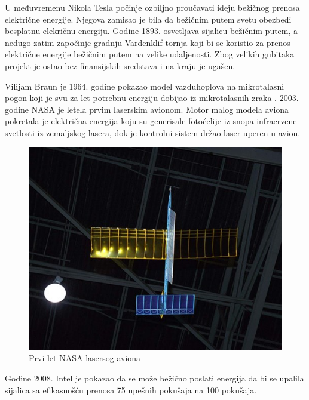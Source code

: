 \documentclass[a4paper]{article}
\begin{document}
U međuvremenu Nikola Tesla počinje ozbiljno proučavati ideju bežičnog prenosa električne energije. Njegova zamisao je bila da bežičnim putem svetu obezbedi besplatnu elekričnu energiju. Godine 1893. osvetljava sijalicu bežičnim putem, a nedugo zatim započinje gradnju Vardenklif tornja
koji bi se koristio za prenos električne energije bežičnim putem na velike udaljenosti. Zbog velikih gubitaka projekt je ostao bez finansijskih sredstava i na kraju je ugašen. 

Vilijam Braun je 1964. godine pokazao model vazduhoplova na mikrotalasni pogon koji je svu
za let potrebnu energiju dobijao iz mikrotalasnih zraka \cite{brown1996history}.
2003. godine NASA je letela prvim laserskim avionom. Motor malog modela aviona pokretala je električna energija koju su generisale fotoćelije iz snopa infracrvene svetlosti iz zemaljskog lasera, dok je kontrolni sistem držao laser uperen u avion.

\begin{figure}[h!]
    \centering
    \includegraphics[scale=0.4]{aircraft.jpg}
    \caption{Prvi let NASA lasersog aviona}
    \label{fig:my_label}
\end{figure}


Godine 2008. Intel je pokazao da se može bežično poslati energija da bi se upalila sijalica sa efikasnošću prenosa 75 upešnih pokušaja na 100 pokušaja.
\end{document}
